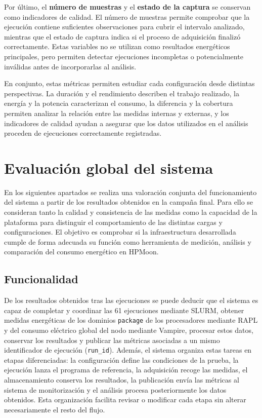 Por último, el \textbf{número de muestras} y el \textbf{estado de la captura} se conservan como indicadores de calidad. El número de muestras permite comprobar que la ejecución contiene suficientes observaciones para cubrir el intervalo analizado, mientras que el estado de captura indica si el proceso de adquisición finalizó correctamente. Estas variables no se utilizan como resultados energéticos principales, pero permiten detectar ejecuciones incompletas o potencialmente inválidas antes de incorporarlas al análisis.

En conjunto, estas métricas permiten estudiar cada configuración desde distintas perspectivas. La duración y el rendimiento describen el trabajo realizado, la energía y la potencia caracterizan el consumo, la diferencia y la cobertura permiten analizar la relación entre las medidas internas y externas, y los indicadores de calidad ayudan a asegurar que los datos utilizados en el análisis proceden de ejecuciones correctamente registradas.

\section{Evaluación global del sistema}
\label{sec:evaluacion-global-cap6}

En los siguientes apartados se realiza una valoración conjunta del funcionamiento del sistema a partir de los resultados obtenidos en la campaña final. Para ello se consideran tanto la calidad y consistencia de las medidas como la capacidad de la plataforma para distinguir el comportamiento de las distintas cargas y configuraciones. El objetivo es comprobar si la infraestructura desarrollada cumple de forma adecuada su función como herramienta de medición, análisis y comparación del consumo energético en HPMoon.

\subsection{Funcionalidad}

De los resultados obtenidos tras las ejecuciones se puede deducir que el sistema es capaz de completar y coordinar las 61 ejecuciones mediante SLURM, obtener medidas energéticas de los dominios \texttt{package} de los procesadores mediante RAPL y del consumo eléctrico global del nodo mediante Vampire, procesar estos datos, conservar los resultados y publicar las métricas asociadas a un mismo identificador de ejecución (\texttt{run\_id}). Además, el sistema organiza estas tareas en etapas diferenciadas: la configuración define las condiciones de la prueba, la ejecución lanza el programa de referencia, la adquisición recoge las medidas, el almacenamiento conserva los resultados, la publicación envía las métricas al sistema de monitorización y el análisis procesa posteriormente los datos obtenidos. Esta organización facilita revisar o modificar cada etapa sin alterar necesariamente el resto del flujo.


